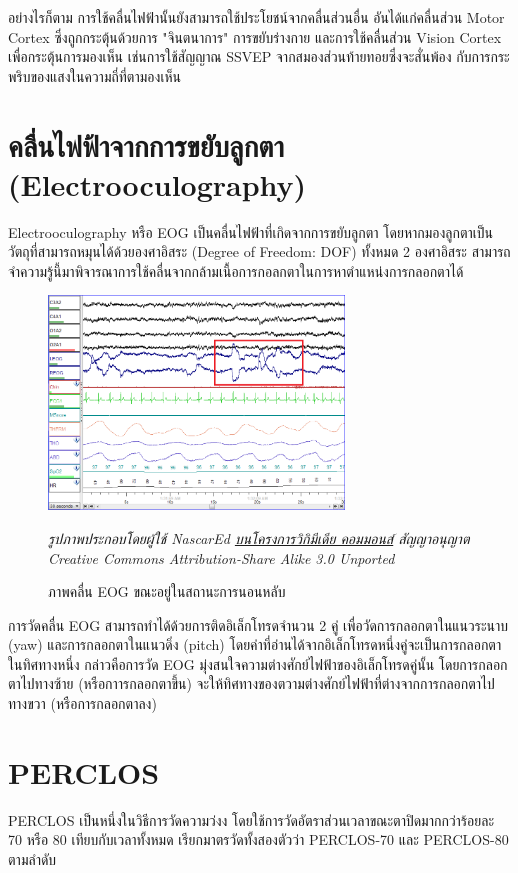 อย่างไรก็ตาม การใช้คลื่นไฟฟ้านั้นยังสามารถใช้ประโยชน์จากคลื่นส่วนอื่น อันได้แก่คลื่นส่วน Motor Cortex ซึ่งถูกกระตุ้นด้วยการ "จินตนาการ"
การขยับร่างกาย และการใช้คลื่นส่วน Vision Cortex เพื่อกระตุ้นการมองเห็น เช่นการใช้สัญญาณ SSVEP จากสมองส่วนท้ายทอยซึ่งจะสั่นพ้อง
กับการกระพริบของแสงในความถี่ที่ตามองเห็น

\section{คลื่นไฟฟ้าจากการขยับลูกตา (Electrooculography)}
Electrooculography หรือ EOG เป็นคลื่นไฟฟ้าที่เกิดจากการขยับลูกตา โดยหากมองลูกตาเป็นวัตถุที่สามารถหมุนได้ด้วยองศาอิสระ (Degree of Freedom: DOF)
ทั้งหมด 2 องศาอิสระ สามารถจำความรู้นี้มาพิจารณาการใช้คลื่นจากกล้ามเนื้อการกอลกตาในการหาตำแหน่งการกลอกตาได้

\begin{figure}[h]
	\centering
	\includegraphics[width=0.7\textwidth]{images/rem_eog.png}
	\caption{ภาพคลื่น EOG ขณะอยู่ในสถานะการนอนหลับ}
	\hspace{\linewidth}
	\textit{รูปภาพประกอบโดยผู้ใช้ NascarEd \href{https://commons.wikimedia.org/wiki/file:sleep\_stage\_rem.png}{บนโครงการวิกิมีเดีย คอมมอนส์}
		สัญญาอนุญาต Creative Commons Attribution-Share Alike 3.0 Unported}
\end{figure}

การวัดคลื่น EOG สามารถทำได้ด้วยการติดอิเล็กโทรดจำนวน 2 คู่ เพื่อวัดการกลอกตาในแนวระนาบ (yaw) และการกลอกตาในแนวดิ่ง (pitch)
โดยค่าที่อ่านได้จากอิเล็กโทรดหนึ่งคู่จะเป็นการกลอกตาในทิศทางหนึ่ง กล่าวคือการวัด EOG มุ่งสนใจความต่างศักย์ไฟฟ้าของอิเล็กโทรดคู่นั้น
โดยการกลอกตาไปทางซ้าย (หรือกาารกลอกตาขึ้น) จะให้ทิศทางของตวามต่างศักย์ไฟฟ้าที่ต่างจากการกลอกตาไปทางขวา (หรือการกลอกตาลง)

\section{PERCLOS}
PERCLOS \cite{perclos} เป็นหนึ่งในวิธีการวัดความว่งง โดยใช้การวัดอัตราส่วนเวลาขณะตาปิดมากกว่าร้อยละ 70 หรือ 80 เทียบกับเวลาทั้งหมด เรียกมาตรวัดทั้งสองตัวว่า PERCLOS-70 และ PERCLOS-80 ตามลำดับ

